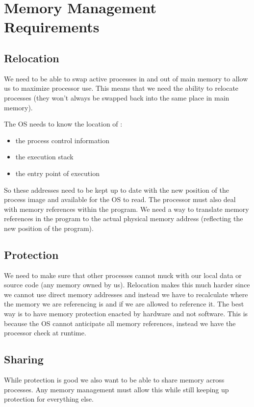 \documentclass[12pt]{article}
\begin{document}

\section{Memory Management Requirements}
\subsection{Relocation}
We need to be able to swap active processes in and out of main memory to allow us to maximize processor use. This means that we need the ability to relocate processes (they won't always be swapped back into the same place in main memory).

The OS needs to know the location of :
\begin{itemize}
  \item the process control information
  \item the execution stack
  \item the entry point of execution
\end{itemize}
So these addresses need to be kept up to date with the new position of the process image and available for the OS to read. The processor must also deal with memory references within the program. We need a way to translate memory references in the program to the actual physical memory address (reflecting the new position of the program).

\subsection{Protection}
We need to make sure that other processes cannot muck with our local data or source code (any memory owned by us). Relocation makes this much harder since we cannot use direct memory addresses and instead we have to recalculate where the memory we are referencing is and if we are allowed to reference it. The best way is to have memory protection enacted by hardware and not software. This is because the OS cannot anticipate all memory references, instead we have the processor check at runtime.

\subsection{Sharing}
While protection is good we also want to be able to share memory across processes. Any memory management must allow this while still keeping up protection for everything else.
\end{document}

